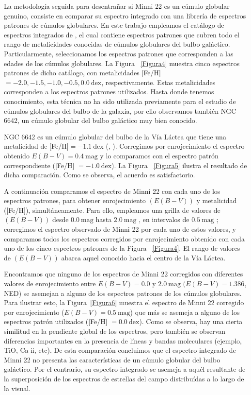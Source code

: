 \documentclass[baaa]{baaa}
\begin{document}
La metodología seguida para desentrañar si Minni 22 es un cúmulo globular genuino, consiste en comparar su espectro integrado con una librería de espectros patrones de cúmulos globulares. En este trabajo empleamos el catálogo de espectros integrados de \cite{bica-1987}, el cual contiene espectros patrones
que cubren todo el rango de metalicidades conocidas de cúmulos globulares del bulbo galáctico. Particularmente, seleccionamos los espectros patrones que corresponden a las edades de los cúmulos globulares. La Figura ~\ref{Figura4} muestra cinco espectros patrones de dicho catálogo, con metalicidades [Fe/H] $= -2.0, -1.5, -1.0, -0.5, 0.0 ~\mathrm{dex}$, respectivamente. Estas metalicidades corresponden a los espectros patrones utilizados. Hasta donde tenemos conocimiento, esta técnica no ha sido utilizada previamente para el estudio de cúmulos globulares del bulbo de la galaxia, por ello observamos también NGC 6642, un cúmulo globular del bulbo galáctico muy bien conocido.

NGC 6642 es un cúmulo globular del bulbo de la Vía Láctea que tiene una metalicidad de [Fe/H]$=-1.1~\mathrm{dex}$ (\cite{harris-2010}, \cite{geisler2023}). Corregimos por enrojecimiento el espectro obtenido  $E(B-V)=0.4~\mathrm{mag}$ \citep{harris-2010} y lo comparamos con el espectro patrón correspondiente ([Fe/H] $=-1.0~\mathrm{dex}$). La Figura  ~\ref{Figura5} ilustra el resultado de dicha comparación. Como se observa, el acuerdo es satisfactorio.

A continuación comparamos el espectro de Minni 22 con cada uno de los espectros patrones, para obtener enrojecimiento $(E(B-V))$ y metalicidad ([Fe/H]), simultáneamente. Para ello, empleamos una grilla de valores de $(E(B-V))$ desde $0.0~\mathrm{mag}$ hasta $2.0~\mathrm{mag}$ , en intervalos de $0.5~\mathrm{mag}$ ; corregimos el espectro observado de Minni 22 por cada uno de estos valores, y comparamos todos los espectros corregidos por enrojecimiento obtenido con cada uno de los cinco espectros patrones de la Figura ~\ref{Figura4}. El rango de valores de $(E(B-V))$ abarca aquel conocido hacia el centro de la Vía Láctea.

Encontramos que ninguno de los espectros de Minni 22 corregidos con diferentes valores de enrojecimiento entre $E(B-V)=0.0$ y $2.0~\mathrm{mag}$ $(E(B-V)=1.386$, NED) se asemejan a alguno de los espectros patrones de los cúmulos globulares. Para ilustrar esto, la Figura~\ref{Figura6} muestra el espectro de Minni 22 corregido por enrojecimiento  ($E(B-V)=0.5~\mathrm{mag}$) que más se asemeja a alguno de los espectros patrón utilizados ([Fe/H] $=0.0~\mathrm{dex}$). Como se observa, hay una cierta similitud en la pendiente global de los espectros, pero también se observan diferencias importantes en la presencia de líneas y bandas moleculares (ejemplo, TiO, Ca {\sc ii}, etc). De esta comparación concluimos que el espectro integrado de Minni 22 no presenta las características de un cúmulo globular del bulbo galáctico. Por el contrario, su
espectro integrado se asemeja a aquél resultante de la superposición de los espectros de estrellas del campo distribuídas a lo largo de la visual.
\end{document}

